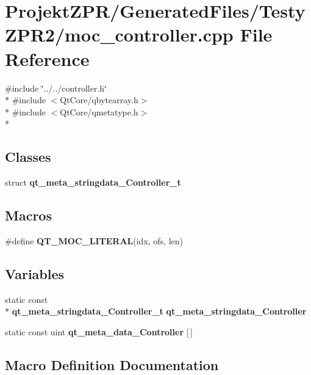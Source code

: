 \section{Projekt\-Z\-P\-R/\-Generated\-Files/\-Testy\-Z\-P\-R2/moc\-\_\-controller.cpp File Reference}
\label{_testy_z_p_r2_2moc__controller_8cpp}
{\ttfamily \#include \char`\"{}../../controller.\-h\char`\"{}}\\*
{\ttfamily \#include $<$Qt\-Core/qbytearray.\-h$>$}\\*
{\ttfamily \#include $<$Qt\-Core/qmetatype.\-h$>$}\\*
\subsection*{Classes}
\begin{DoxyCompactItemize}
\item 
struct {\bf qt\-\_\-meta\-\_\-stringdata\-\_\-\-Controller\-\_\-t}
\end{DoxyCompactItemize}
\subsection*{Macros}
\begin{DoxyCompactItemize}
\item 
\#define {\bf Q\-T\-\_\-\-M\-O\-C\-\_\-\-L\-I\-T\-E\-R\-A\-L}(idx, ofs, len)
\end{DoxyCompactItemize}
\subsection*{Variables}
\begin{DoxyCompactItemize}
\item 
static const \\*
{\bf qt\-\_\-meta\-\_\-stringdata\-\_\-\-Controller\-\_\-t} {\bf qt\-\_\-meta\-\_\-stringdata\-\_\-\-Controller}
\item 
static const uint {\bf qt\-\_\-meta\-\_\-data\-\_\-\-Controller} [$\,$]
\end{DoxyCompactItemize}


\subsection{Macro Definition Documentation}
